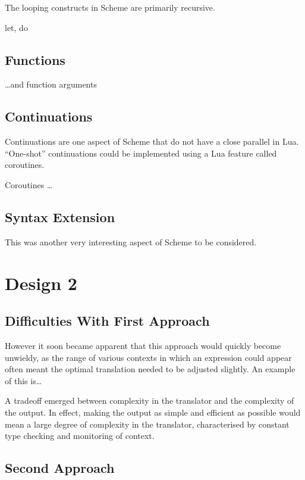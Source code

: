 The looping constructs in Scheme are primarily recursive.

let, do

\subsection{Functions}

\ldots and function arguments

\subsection{Continuations}

Continuations are one aspect of Scheme that do not have a close parallel in
Lua. ``One-shot'' continuations could be implemented using a Lua feature called
coroutines.

Coroutines \ldots

\subsection{Syntax Extension}

This was another very interesting aspect of Scheme to be considered. 


\section{Design 2}

\subsection{Difficulties With First Approach}

However it soon became apparent that this approach would quickly become
unwieldy, as the range of various contexts in which an expression could appear
often meant the optimal translation needed to be adjusted slightly. An example
of this is\ldots

A tradeoff emerged between complexity in the translator and the complexity of
the output. In effect, making the output as simple and efficient as
possible would mean a large degree of complexity in the translator,
characterised by constant type checking and monitoring of context.

\subsection{Second Approach}

